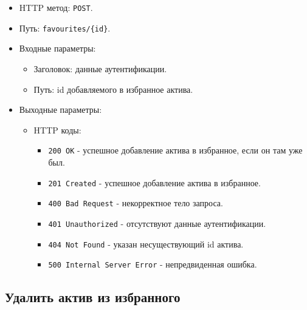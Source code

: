 \documentclass[a4paper, 14pt]{article}
\begin{document}
\begin{itemize}
    \item HTTP метод: \texttt{POST}.
    \item Путь: \texttt{favourites/\{id\}}.
    \item Входные параметры:
    \begin{itemize}
        \item Заголовок: данные аутентификации.
        \item Путь: id добавляемого в избранное актива.
    \end{itemize}
    \item Выходные параметры:
    \begin{itemize}
        \item HTTP коды:
        \begin{itemize}
            \item \texttt{200 OK} - успешное добавление актива в избранное, если он там уже был.
            \item \texttt{201 Created} - успешное добавление актива в избранное.
            \item \texttt{400 Bad Request} - некорректное тело запроса.
            \item \texttt{401 Unauthorized} - отсутствуют данные аутентификации.
            \item \texttt{404 Not Found} - указан несуществующий id актива.
            \item \texttt{500 Internal Server Error} - непредвиденная ошибка.
        \end{itemize}
    \end{itemize}
\end{itemize}

\subsection{Удалить актив из избранного}
\end{document}
